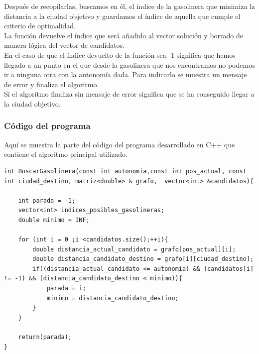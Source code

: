 \documentclass[11pt,a4paper]{article} %
\begin{document}
Después de recopilarlas, buscamos en él, el índice de la gasolinera que minimiza la distancia a la ciudad objetivo y guardamos el índice de aquella que cumple el criterio de optimalidad.\\

La función devuelve el índice que será añadido al vector solución y borrado de manera lógica del vector de candidatos.\\

En el caso de que el índice devuelto de la función sea -1 significa que hemos llegado a un punto en el que desde la gasolinera que nos encontramos no podemos ir a ninguna otra con la autonomía dada. Para indicarlo se muestra un mensaje de error y finaliza el algoritmo.\\

Si el algoritmo finaliza sin mensaje de error significa que se ha conseguido llegar a la ciudad objetivo.\\

\subsubsection{Código del programa}
Aquí se muestra la parte del código del programa desarrollado en C++ que contiene el algoritmo principal utilizado.

\begin{lstlisting}[style=C++]
int BuscarGasolinera(const int autonomia,const int pos_actual, const int ciudad_destino, matriz<double> & grafo,  vector<int> &candidatos){

	int parada = -1;
	vector<int> indices_posibles_gasolineras;
	double minimo = INF;
	
	for (int i = 0 ;i <candidatos.size();++i){
		double distancia_actual_candidato = grafo[pos_actual][i];
		double distancia_candidato_destino = grafo[i][ciudad_destino];
		if((distancia_actual_candidato <= autonomia) && (candidatos[i] != -1) && (distancia_candidato_destino < minimo)){
			parada = i;
			minimo = distancia_candidato_destino;
		}
	}
	
	return(parada);
}
\end{lstlisting}
\end{document}
